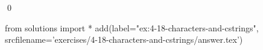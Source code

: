 
\begin{ex}
  \label{ex:4-18-characters-and-cstrings}
  
  \qed
\end{ex}
\begin{python0}
from solutions import *
add(label="ex:4-18-characters-and-cstrings",
    srcfilename='exercises/4-18-characters-and-cstrings/answer.tex')
\end{python0}

